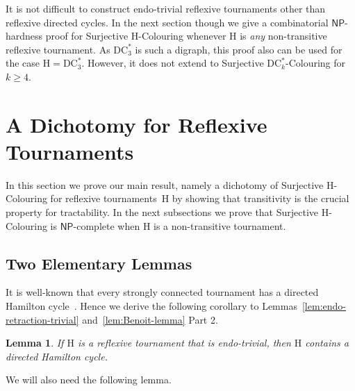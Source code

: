 \documentclass[a4paper,12pt]{article}
\newtheorem{lemma}{Lemma}
\theoremstyle{remark}
\newcommand{\NP}[0]{\ensuremath{\mathsf{NP}}}
\newcommand{\DC}[0]{\ensuremath{\mathrm{DC}}}
\renewcommand{\H}{\ensuremath{\mathrm{H}}}
\begin{document}
It is not difficult to construct endo-trivial reflexive tournaments other than reflexive directed cycles.
In the next section though we give a combinatorial \NP-hardness proof for {\sc Surjective $\H$-Colouring} whenever $\H$ is {\it any} non-transitive reflexive tournament. As $\DC^*_3$ is such a digraph, this proof also can be used for the case $\H=\DC^*_3$.
However, it does not extend to {\sc Surjective $\DC^*_k$-Colouring} for $k\geq 4$.


\section{A Dichotomy for Reflexive Tournaments}\label{s-tour}
\label{sec:main}

In this section we prove our main result, namely a dichotomy of {\sc Surjective $\H$-Colouring} for reflexive tournaments~$\H$ by showing that transitivity is the crucial property for tractability. In the next subsections we prove that {\sc Surjective $\H$-Colouring} is \NP-complete when $\H$ is a non-transitive tournament. 

\subsection{Two Elementary Lemmas}
It is well-known that every strongly connected tournament has a directed Hamilton cycle~\cite{Camion59}.
Hence we derive the following corollary to Lemmas~\ref{lem:endo-retraction-trivial} and~\ref{lem:Benoit-lemma} Part 2.
\begin{lemma}
If $\H$ is a reflexive tournament that is endo-trivial, then $\H$ contains a directed Hamilton cycle.
\label{l-Ham}
\end{lemma}

We will also need the following lemma.
\end{document}
